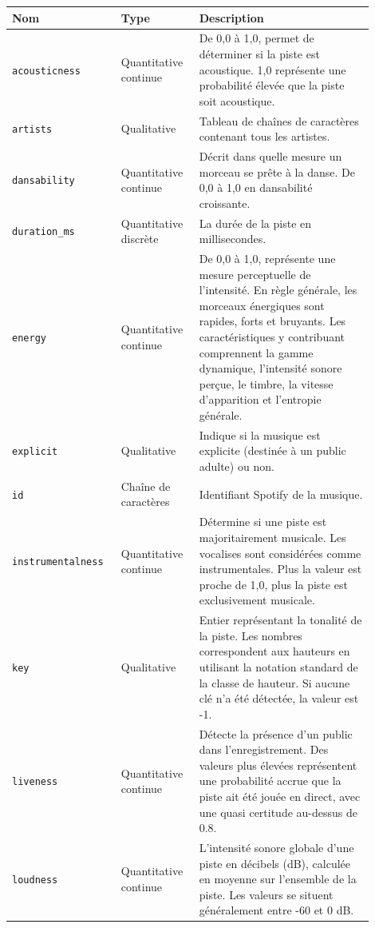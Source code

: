 \documentclass[a4paper, 12pt]{report}
\begin{document}
\begin{longtable}{|p{0.25\linewidth}|p{0.20\linewidth}|p{0.45\linewidth}|}
\hline
\textbf{Nom} & \textbf{Type} & \textbf{Description} \\
\hline
\verb|acousticness| & Quantitative continue & De 0,0 à 1,0, permet de déterminer si la piste est acoustique. 1,0 représente une probabilité élevée que la piste soit acoustique. \\
\hline
\verb|artists| & Qualitative & Tableau de chaînes de caractères contenant tous les artistes. \\
\hline
\verb|dansability| & Quantitative continue & Décrit dans quelle mesure un morceau se prête à la danse. De 0,0 à 1,0 en dansabilité croissante. \\
\hline
\verb|duration_ms| & Quantitative discrète & La durée de la piste en millisecondes. \\
\hline
\verb|energy| & Quantitative continue & De 0,0 à 1,0, représente une mesure perceptuelle de l'intensité. En règle générale, les morceaux énergiques sont rapides, forts et bruyants. Les caractéristiques y contribuant comprennent la gamme dynamique, l'intensité sonore perçue, le timbre, la vitesse d'apparition et l'entropie générale. \\
\hline
\verb|explicit| & Qualitative & Indique si la musique est explicite (destinée à un public adulte) ou non. \\
\hline
\verb|id| & Chaîne de caractères & Identifiant Spotify de la musique. \\
\hline
\verb|instrumentalness| & Quantitative continue & Détermine si une piste est majoritairement musicale. Les vocalises sont considérées comme instrumentales. Plus la valeur est proche de 1,0, plus la piste est exclusivement musicale. \\
\hline
\verb|key| & Qualitative & Entier représentant la tonalité de la piste. Les nombres correspondent aux hauteurs en utilisant la notation standard de la classe de hauteur. Si aucune clé n'a été détectée, la valeur est -1. \\
\hline
\verb|liveness| & Quantitative continue & Détecte la présence d'un public dans l'enregistrement. Des valeurs plus élevées représentent une probabilité accrue que la piste ait été jouée en direct, avec une quasi certitude au-dessus de 0.8. \\
\hline
\verb|loudness| & Quantitative continue & L'intensité sonore globale d'une piste en décibels (dB), calculée en moyenne sur l'ensemble de la piste. Les valeurs se situent généralement entre -60 et 0 dB. \\

\end{longtable}
\end{document}
